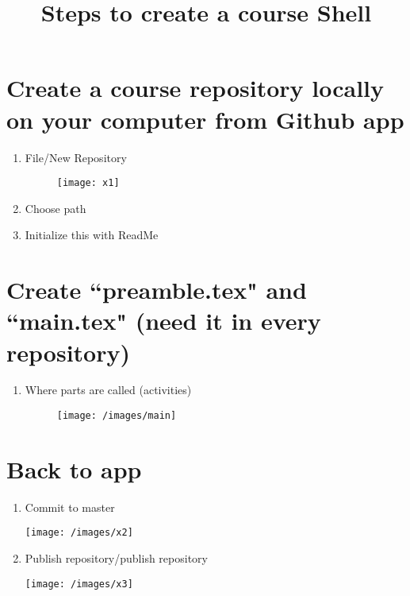 \documentclass{ximera}
\title{Steps to create a course Shell }
\begin{document}
\begin{abstract}
\end{abstract}
\maketitle

\section{Create a course repository locally on your computer from Github app}
\begin{enumerate}
\item File/New Repository
\begin{center}
\begin{figure}[h]
\texttt{[image: x1]}
\end{figure}
\end{center}
\item	Choose path
\item Initialize this with ReadMe
\end{enumerate}

\section{Create ``preamble.tex" and ``main.tex" (need it in every repository)}
\begin{enumerate}
\item Where parts are called (activities)
\begin{center}
\begin{figure}
\texttt{[image: /images/main]}
\end{figure}
\end{center}
\end{enumerate}

\section{Back to app}
\begin{enumerate}
\item Commit to master
\begin{center}
\texttt{[image: /images/x2]}
\end{center}
\item Publish repository/publish repository   
\begin{center}
\texttt{[image: /images/x3]}
\end{center}
\end{enumerate}
\end{document}
